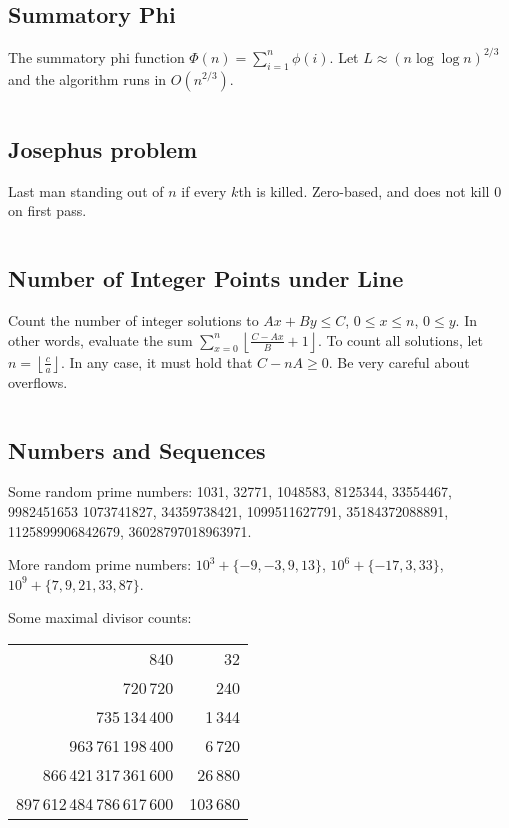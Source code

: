 \documentclass[8pt,a4paper,landscape,oneside]{amsart}
\newcommand{\code}[1]{\inputminted[fontsize=\normalsize,baselinestretch=1,breaklines,tabsize=2]{cpp}{code/#1}}
\begin{document}
\begin{multicols*}{3}
\subsection{Summatory Phi}
        The summatory phi function $\Phi(n) = \sum_{i=1}^n \phi(i)$. Let $L\approx
        (n\log{\log{n}})^{2/3}$ and the algorithm runs in $O(n^{2/3})$.
        \code{math/summatory_phi.cpp}
    \fi

\subsection{Josephus problem}
        Last man standing out of $n$ if every $k$th is killed. Zero-based, and
        does not kill $0$ on first pass.
        \code{math/josephus.cpp}

\subsection{Number of Integer Points under Line}
        Count the number of integer solutions to $Ax+By\leq C$, $0 \leq x \leq
        n$, $0 \leq y$. In other words, evaluate the sum $\sum_{x=0}^n
        \left\lfloor \frac{C-Ax}{B} + 1\right\rfloor$. To count all solutions,
        let $n = \left\lfloor \frac{c}{a}\right\rfloor$. In any case, it must hold
        that $C-nA \geq 0$. Be very careful about overflows.
        \code{math/floor_sum.cpp}

\subsection{Numbers and Sequences}
        Some random prime numbers: 1031, 32771, 1048583, 8125344, 33554467, 9982451653
        1073741827, 34359738421, 1099511627791, 35184372088891,
        1125899906842679, 36028797018963971.

        More random prime numbers: $10^3 + \{-9,-3,9,13\}$, $10^6+
        \{-17,3,33\}$, $10^9+ \{7,9,21,33,87\}$.

        Some maximal divisor counts:
        \begin{tabular}{rr}
        840 & 32 \\
        720\,720 & 240 \\
        735\,134\,400 & 1\,344 \\
        963\,761\,198\,400 & 6\,720 \\
        866\,421\,317\,361\,600 & 26\,880 \\
        897\,612\,484\,786\,617\,600 & 103\,680 \\
        \end{tabular}


\end{multicols*}
\end{document}
